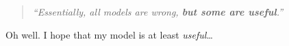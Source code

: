 
\begin{preamble}
    \thispagestyle{empty}
    \begin{quote}
        \emph{``Essentially, all models are wrong, \textbf{but some are useful}.''}
        \vspace*{4mm}
    \end{quote}
    
    Oh well. I hope that my model is at least \emph{useful}\ldots
\end{preamble}